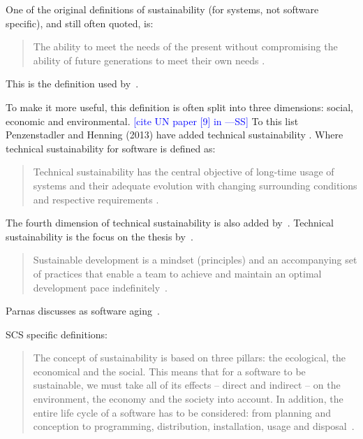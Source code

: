 \documentclass[12pt]{article}
\newcommand{\authornote}[3]{\textcolor{#1}{[#3 ---#2]}}
\newcommand{\authornote}[3]{}
\newcommand{\wss}[1]{\authornote{blue}{SS}{#1}} %
\begin{document}
One of the original definitions of sustainability (for systems, not software
specific), and still often quoted, is:

\begin{quotation}
\noindent The ability to meet the needs of the present without compromising the ability of
future generations to meet their own needs \cite{Brundtland1987}.
\end{quotation}

This is the definition used by~\cite{IISD2019}.

To make it more useful, this definition is often split into three dimensions:
social, economic and environmental. \wss{cite UN paper [9] in
  \cite{PenzenstadlerAndHenning2013}}  To this list Penzenstadler and Henning
(2013) have added technical sustainability \cite{PenzenstadlerAndHenning2013}.
Where technical sustainability for software is defined as:

\begin{quotation}
\noindent Technical sustainability has the central objective of long-time
usage of systems and their adequate evolution with changing surrounding
conditions and respective requirements \cite{PenzenstadlerAndHenning2013}.
\end{quotation}

The fourth dimension of technical sustainability is also added
by~\cite{WolframEtAl2017}.  Technical sustainability is the focus on the thesis
by~\cite{Hygerth2016}.

\begin{quotation}
  \noindent Sustainable development is a mindset (principles) and an
  accompanying set of practices that enable a team to achieve and maintain an
  optimal development pace indefinitely~\cite{Tate2005}.
\end{quotation}

Parnas discusses as software aging~\cite{Parnas1994a}.

SCS specific definitions:

\begin{quotation}
  \noindent The concept of sustainability is based on three pillars: the
  ecological, the economical and the social. This means that for a software to
  be sustainable, we must take all of its effects -- direct and indirect -- on
  the environment, the economy and the society into account. In addition, the
  entire life cycle of a software has to be considered: from planning and
  conception to programming, distribution, installation, usage and
  disposal~\cite{Heine2017}.
\end{quotation}
\end{document}
